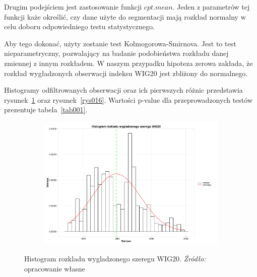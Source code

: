 \documentclass[polish, twoside, 12pt, a4paper]{article}
\theoremstyle{definition}
\theoremstyle{plain}
\theoremstyle{remark}
\begin{document}
Drugim podejściem jest zastosowanie funkcji \(cpt.mean\). Jeden z parametrów tej funkcji każe określić, czy dane użyte do segmentacji mają rozkład normalny w celu doboru odpowiedniego testu statystycznego.

Aby tego dokonać, użyty zostanie test Kołmogorowa-Smirnova. Jest to test nieparametryczny, pozwalający na badanie podobieństwa rozkładu danej zmiennej z innym rozkładem. W naszym 
przypadku hipoteza zerowa zakłada, że rozkład wygładzonych obserwacji indeksu WIG20 jest zbliżony do normalnego.

Histogramy odfiltrowanych obserwacji oraz ich pierwszych różnic przedstawia rysunek~\ref{rys015} oraz rysunek~\ref{rys016}. Wartości p-value dla przeprowadzonych testów prezentuje tabela~\ref{tab001}.

\begin{figure}[H]
  \centering

  \begin{subfigure}[t]{1.00\textwidth}
    \includegraphics[width=\textwidth]{./rys015}
  \end{subfigure}

  \captionsetup{margin=10pt,font=small,labelfont=bf,width=.8\textwidth}

  \caption[Histogram rozkladu wygladzonego szeregu WIG20]{Histogram rozkladu wygladzonego szeregu WIG20. \textit{Źródło:} opracowanie własne}\label{rys015}
\end{figure}
\end{document}

